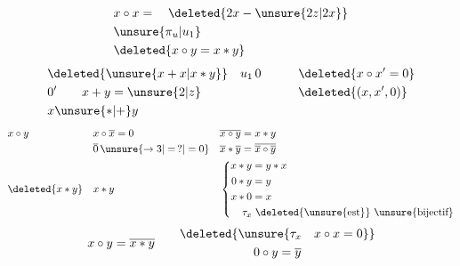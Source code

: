 \[
\begin{aligned}
 &x\circ x=\quad\deleted{2x- \unsure{2z|2x}}\\
 &\unsure{\pi_{u}|u_1}\\
 &\deleted{x\circ y=x*y}
\end{aligned}
\]
\[
\begin{aligned}
 &\deleted{\unsure{x+x|x*y}}\quad u_1\,0\qquad &&\deleted{x\circ x'=0}\\
 &0'\qquad x+y=\unsure{2|z}&&\deleted{(x,x',0)}\\
 &x\unsure{*|+}y
\end{aligned}
\]
\[
\begin{aligned}
 &x\circ y &&x\circ \overline{x}=0 &&\overline{x\circ y}=x*y\\
 &&&\overline{0}\,\unsure{\to3|=\,?|=0} &&\overline{x}*\overline{y}=\overline{\overline{x}\circ \overline{y}}\\
 &\deleted{x*y} &&x*y &&
 \left\{\begin{aligned}
 x*y&=y*x\\ 0*y&=y\\x*0&=x\\
 \tau_x&\ \deleted{\unsure{\text{est}}}\ \text{\unsure{bijectif}}
 \end{aligned}\right.
\end{aligned}
\]
\[
 x\circ y=\overline{x*y}\qquad
 \begin{gathered}\deleted{\unsure{\tau_x\quad x\circ x=0}}\\ 0\circ y=\overline{y}\end{gathered}
\]
